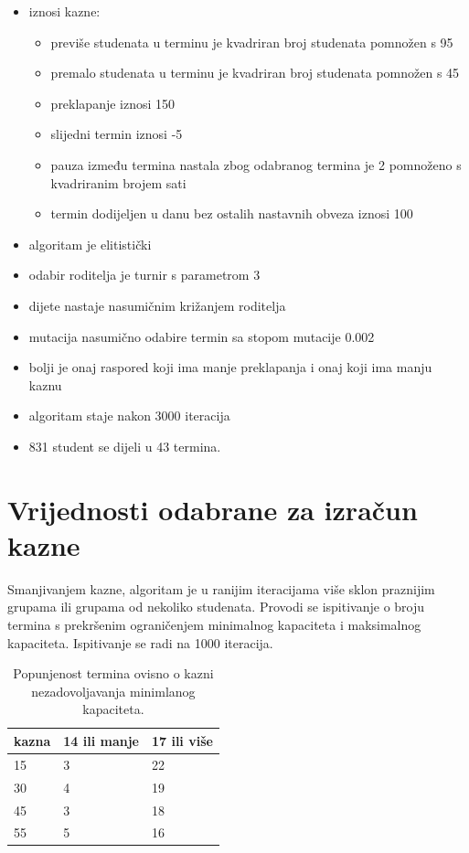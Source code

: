 \documentclass[times, utf8, zavrsni]{fer}
\begin{document}
\begin{itemize}
	\item iznosi kazne:
	\begin{itemize}
		\item previše studenata u terminu je kvadriran broj studenata pomnožen s 95
		\item premalo studenata u terminu  je kvadriran broj studenata pomnožen s 45
		\item preklapanje iznosi 150
		\item slijedni termin iznosi -5
		\item pauza između termina nastala zbog odabranog termina je 2 pomnoženo s kvadriranim brojem sati
		\item termin dodijeljen u danu bez ostalih nastavnih obveza iznosi 100
	\end{itemize}	
	\item algoritam je elitistički
	\item odabir roditelja je turnir s parametrom 3
	\item dijete nastaje nasumičnim križanjem roditelja
	\item mutacija nasumično odabire termin sa stopom mutacije 0.002
	\item bolji je onaj raspored koji ima manje preklapanja i onaj koji ima manju kaznu
	\item algoritam staje nakon 3000 iteracija
	\item 831 student se dijeli u 43 termina.
\end{itemize}

\section{Vrijednosti odabrane za izračun kazne}

Smanjivanjem kazne, algoritam je u ranijim iteracijama više sklon praznijim grupama ili grupama od nekoliko studenata. Provodi se ispitivanje o broju termina s prekršenim ograničenjem minimalnog kapaciteta i maksimalnog kapaciteta. Ispitivanje se radi na 1000 iteracija.

\begin{table}[htb]
\caption{Popunjenost termina ovisno o kazni nezadovoljavanja minimlanog kapaciteta.}
\label{tbl:min-popunjenost}
\centering
\begin{tabular}{lll} \hline
kazna & 14 ili manje &  17 ili više \\ \hline
15 & 3 & 22 \\
30 & 4 & 19 \\
45 & 3 & 18 \\
55 & 5 & 16 \\ \hline
\end{tabular}
\end{table}
\end{document}
